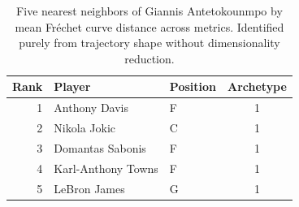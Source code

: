 \begin{table}[htbp]
  \centering\small
  \begin{tabular}{rllc}
    \toprule
    Rank & Player & Position & Archetype \\
    \midrule
    1 & Anthony Davis & F & 1 \\
    2 & Nikola Jokic & C & 1 \\
    3 & Domantas Sabonis & F & 1 \\
    4 & Karl-Anthony Towns & F & 1 \\
    5 & LeBron James & G & 1 \\
    \bottomrule
  \end{tabular}
  \caption{Five nearest neighbors of Giannis Antetokounmpo by mean Fr\'{e}chet curve distance across metrics. Identified purely from trajectory shape without dimensionality reduction.}
  \label{tab:Giannis_Antetokounmpo_frechet_curve_neighbors}
\end{table}

